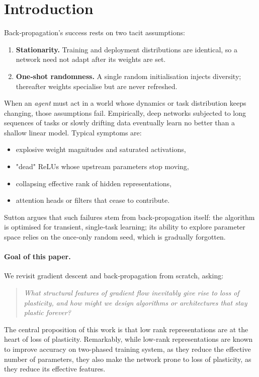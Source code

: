 \documentclass{article}
\begin{document}
\section{Introduction}
Back‑propagation's success rests on two tacit assumptions:
\begin{enumerate}
    \item \textbf{Stationarity.}  Training and deployment distributions are identical, so a network need not adapt after its weights are set.
    \item \textbf{One‑shot randomness.}  A single random initialisation injects diversity; thereafter weights specialise but are never refreshed.
\end{enumerate}
When an \emph{agent} must act in a world whose dynamics or task distribution keeps changing, those assumptions fail.  
Empirically, deep networks subjected to long sequences of tasks or slowly drifting data eventually learn no better than a shallow linear model.  
Typical symptoms are:
\begin{itemize}[nosep]
    \item explosive weight magnitudes and saturated activations,
    \item "dead" ReLUs whose upstream parameters stop moving,
    \item collapsing effective rank of hidden representations,
    \item attention heads or filters that cease to contribute.
\end{itemize}
Sutton argues that such failures stem from back‑propagation itself: the algorithm is optimised for transient, single‑task learning; its ability to explore parameter space relies on the once‑only random seed, which is gradually forgotten. 

\paragraph{Goal of this paper.}
We revisit gradient descent and back‑propagation from scratch, asking:

\begin{quote}
\emph{What structural features of gradient flow inevitably give rise to loss of plasticity, and how might we design algorithms or architectures that stay plastic forever?}
\end{quote}

The central proposition of this work is that low rank representations are at the heart of loss of plasticity. Remarkably, while low-rank representations are known to improve accuracy on two-phased training system, as they reduce the effective number of parameters, they also make the network prone to loss of plasticity, as they reduce its effective features. 
\end{document}
